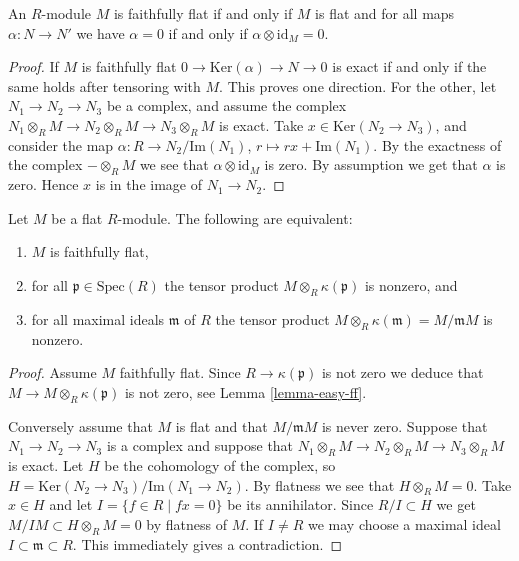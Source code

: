 \begin{lemma}
\label{lemma-easy-ff}
An $R$-module $M$ is faithfully flat if and only if $M$ is flat
and for all maps $\alpha : N \to N'$ we have
$\alpha = 0$ if and only if $\alpha \otimes \text{id}_M = 0$.
\end{lemma}

\begin{proof}
If $M$ is faithfully flat $0 \to \text{Ker}(\alpha)
\to N \to 0$ is exact if and only if the same holds
after tensoring with $M$. This proves one direction.
For the other, let $N_1 \to N_2 \to N_3$
be a complex, and assume the complex
$N_1 \otimes_R M \to N_2 \otimes_R M \to N_3\otimes_R M$
is exact. Take $x \in \text{Ker}(N_2 \to N_3)$,
and consider the map $\alpha : R\to N_2/\text{Im}(N_1)$,
$r \mapsto rx + \text{Im}(N_1)$. By the exactness
of the complex $-\otimes_R M$ we see that $\alpha \otimes
\text{id}_M$ is zero. By assumption we get that $\alpha$ is
zero. Hence $x $ is in the image of $N_1 \to N_2$.
\end{proof}

\begin{lemma}
\label{lemma-ff}
Let $M$ be a flat $R$-module.
The following are equivalent:
\begin{enumerate}
\item $M$ is faithfully flat,
\item for all $\mathfrak p \in \text{Spec}(R)$
the tensor product $M\otimes_R \kappa(\mathfrak p)$ is nonzero, and
\item for all maximal ideals $\mathfrak m$ of $R$
the tensor product $M\otimes_R \kappa(\mathfrak m) = M/{\mathfrak m}M$
is nonzero.
\end{enumerate}
\end{lemma}

\begin{proof}
Assume $M$ faithfully flat. Since $R \to \kappa({\mathfrak p})$ is not
zero we deduce that $M \to M \otimes_R \kappa({\mathfrak p})$ is not zero,
see Lemma \ref{lemma-easy-ff}.

\medskip\noindent
Conversely assume that $M$ is flat and that
$M/{\mathfrak m}M$ is never zero.
Suppose that $N_1 \to N_2 \to N_3$ is a complex and
suppose that $N_1 \otimes_R M \to N_2\otimes_R M \to
N_3\otimes_R M$ is exact. Let $H$ be the cohomology of the complex,
so $H = \text{Ker}(N_2 \to N_3)/\text{Im}(N_1 \to N_2)$.
By flatness we see that $H \otimes_R M = 0$.
Take $x \in H$ and let $I = \{f \in R \mid fx = 0 \}$
be its annihilator. Since $R/I \subset H$ we get
$M/IM \subset H\otimes_R M = 0$ by flatness of $M$.
If $I \not=  R$ we may choose
a maximal ideal $I \subset \mathfrak m \subset R$.
This immediately gives a contradiction.
\end{proof}

